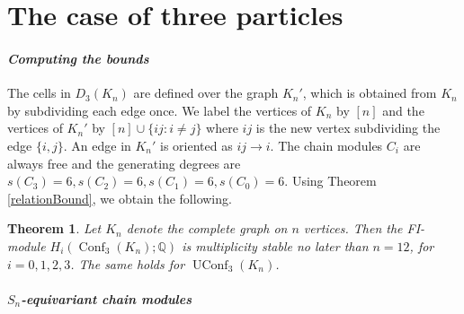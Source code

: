 \documentclass[12pt]{amsart}
\newtheorem{thm}{Theorem}[section]
\theoremstyle{definition}
\newcommand{\Q}{\mathbb{Q}}
\newcommand{\conf}{\operatorname{Conf}}
\newcommand{\uconf}{\operatorname{UConf}}
\begin{document}
\section{The case of three particles}

\paragraph{\textit{Computing the bounds}}

The cells in $D_3(K_n)$ are defined over the graph $K_n'$, which is obtained from $K_n$ by subdividing each edge once. We label the vertices of $K_n$ by $[n]$ and the vertices of $K_n'$ by $[n]\cup\{ij:i\neq j\}$ where $ij$ is the new vertex subdividing the edge $\{i,j\}$. An edge in $K_n'$ is oriented as $ij \to i$. The chain modules $C_i$ are always free and the generating degrees are $s(C_3)=6, s(C_2) = 6, s(C_1) = 6, s(C_0) = 6$. Using Theorem \ref{relationBound}, we obtain the following.

\begin{thm} \label{completeBound}
Let $K_n$ denote the complete graph on $n$ vertices. Then the FI-module $H_i(\conf_3(K_n);\Q)$ is multiplicity stable no later than $n = 12$, for $i=0,1,2,3$. The same holds for $\uconf_3(K_n)$.
\end{thm}

\paragraph{\textit{$S_n$-equivariant chain modules}}
\end{document}

